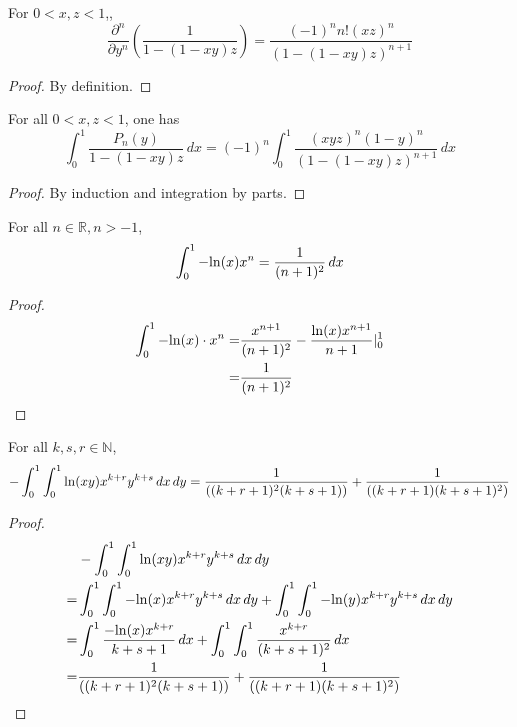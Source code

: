 
\begin{lemma}\label{frac_partial_n}
    For $ 0 < x, z < 1$,,
    \[ \frac{\partial^n}{\partial y^n}(\frac{1}{1 - (1-xy)z}) = \frac{(-1)^nn!(xz)^n}{(1 - (1-xy)z)^{n+1}} \]
\end{lemma}
\begin{proof}
    \leanok
    By definition.
\end{proof}

\begin{lemma}\label{Legendre_poly_mul_frac_integral}
    For all $ 0 < x, z < 1$, one has
    \[ \int_{0}^{1}\frac{P_n(y)}{1 - (1-xy)z} \, dx =(-1)^n \int_{0}^{1} \frac{(xyz)^n(1-y)^n}{(1 - (1-xy)z)^{n+1}} \, dx \]
\end{lemma}
\begin{proof}
    \leanok
    By induction and integration by parts.
\end{proof}

\begin{lemma}\label{log_pow_integral}
    For all $n \in \mathbb{R}, n > -1$,
    \[ \int_{0}^{1} -{\rm ln}(x) x^n = \frac{1}{(n + 1)^2} \, dx \]
\end{lemma}
\begin{proof}
    \leanok
    \begin{align*}
        \int_{0}^{1} -{\rm ln}(x)\cdot x^n =& \frac{x^{n+1}}{(n+1)^2} - \frac{{\rm ln}(x) x^{n+1}}{n+1} |_0^1 \\
        =& \frac{1}{(n+1)^2}
    \end{align*}
\end{proof}

\begin{lemma}\label{J_rs_eq_sum_aux}
    For all $k,s,r \in \mathbb{N}$,
    \[-\int_{0}^{1}\int_{0}^{1} {\rm ln}(xy)x^{k+r}y^{k+s}\, dx \, dy = \frac{1}{((k+r+1)^2(k+s+1))}+\frac{1}{((k+r+1)(k+s+1)^2)}\]
\end{lemma}
\begin{proof}
    \leanok
    \begin{align*}
         &-\int_{0}^{1}\int_{0}^{1} {\rm ln}(xy)x^{k+r}y^{k+s}\, dx \, dy \\
        =& \int_{0}^{1}\int_{0}^{1} -{\rm ln}(x)x^{k+r}y^{k+s}\, dx \, dy + \int_{0}^{1}\int_{0}^{1} -{\rm ln}(y)x^{k+r}y^{k+s}\, dx \, dy \\
        =& \int_{0}^{1} \frac{-{\rm ln}(x)x^{k+r}}{k+s+1} \, dx + \int_{0}^{1}\int_{0}^{1} \frac{x^{k+r}}{(k+s+1)^2}\, dx\\
        =& \frac{1}{((k+r+1)^2(k+s+1))} + \frac{1}{((k+r+1)(k+s+1)^2)}
    \end{align*}
\end{proof}

